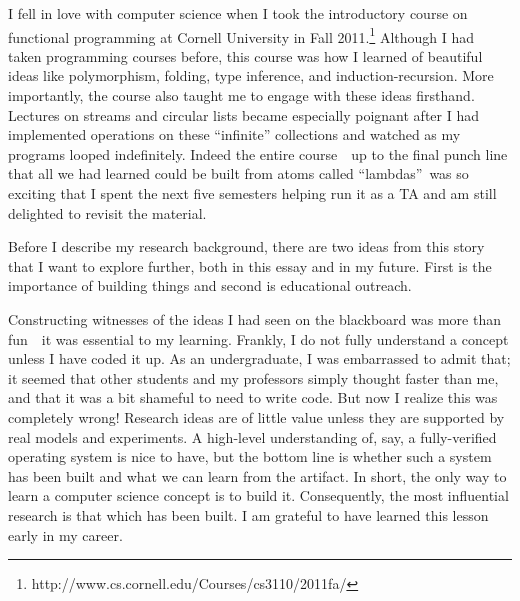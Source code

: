 \documentclass[12pt]{article}
\begin{document}
I fell in love with computer science when I took the introductory course on functional programming at Cornell University in Fall 2011.\footnote{http://www.cs.cornell.edu/Courses/cs3110/2011fa/}
Although I had taken programming courses before, this course was how I learned of beautiful ideas like polymorphism, folding, type inference, and induction-recursion.
More importantly, the course also taught me to engage with these ideas firsthand.
Lectures on streams and circular lists became especially poignant after I had implemented operations on these ``infinite'' collections and watched as my programs looped indefinitely.
Indeed the entire course~\textemdash~up to the final punch line that all we had learned could be built from atoms called ``lambdas''\textemdash~was so exciting that I spent the next five semesters helping run it as a TA and am still delighted to revisit the material.


Before I describe my research background, there are two ideas from this story that I want to explore further, both in this essay and in my future.
First is the importance of building things and second is educational outreach.

Constructing witnesses of the ideas I had seen on the blackboard was more than fun~\textemdash~it was essential to my learning.
Frankly, I do not fully understand a concept unless I have coded it up.
As an undergraduate, I was embarrassed to admit that; it seemed that other students and my professors simply thought faster than me, and that it was a bit shameful to need to write code.
But now I realize this was completely wrong!
Research ideas are of little value unless they are supported by real models and experiments.
A high-level understanding of, say, a fully-verified operating system is nice to have, but the bottom line is whether such a system has been built and what we can learn from the artifact.
In short, the only way to learn a computer science concept is to build it.
Consequently, the most influential research is that which has been built.
I am grateful to have learned this lesson early in my career.
\end{document}
